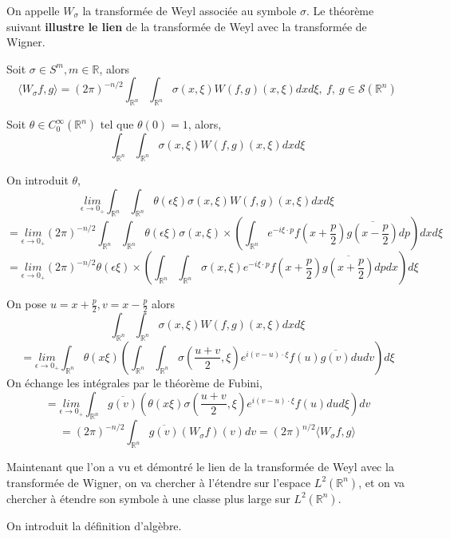 \documentclass[a4paper, 12pt]{report}
\newcommand{\R}{\mathbb{R}} %
\newcommand{\ra}[1][]{\overset{#1}{\rightarrow}} %
\renewcommand{\.}{\cdot} %
\theoremstyle{break}
\theoremstyle{remark}
\theoremstyle{proofstyle}
\begin{document}
On appelle $W_\sigma$ la transformée de Weyl associée au symbole $\sigma$. Le théorème suivant \textbf{illustre le lien} de la transformée de Weyl avec la transformée de Wigner.\vspace{5pt}

\begin{theorem}
    Soit $\sigma \in S^m, m \in \R$, alors
    $$\langle W_\sigma f, g \rangle = (2 \pi)^{-n/2} \int_{\R^n} \int_{\R^n} \sigma(x, \xi) W(f,g) (x, \xi) dx d\xi,~ f,~ g \in \mathcal{S} (\R^n)$$
\end{theorem}
\begin{preuve}
    Soit $\theta \in C_0^\infty(\R^n)$ tel que $\theta(0)=1$, alors,
    $$\int_{\R^n} \int_{\R^n} \sigma(x, \xi) W(f,g)(x,\xi) dx d\xi$$

    On introduit $\theta$,
    $$\underset{\epsilon \ra 0_+}{lim} \int_{\R^n}  \int_{\R^n} \theta( \epsilon \xi) \sigma (x, \xi) W(f,g)(x, \xi) dx d\xi$$
    $$=\underset{\epsilon \ra 0_+}{lim} (2 \pi)^{-n/2} \int_{\R^n}  \int_{\R^n}\theta( \epsilon \xi) \sigma (x, \xi) \times \left( \int_{\R^n} e^{-i \xi \. p} f\left(x+\frac{p}{2}\right) \overline{g\left(x-\frac{p}{2}\right)} dp\right) dx d\xi $$
    $$ = \underset{\epsilon \ra 0_+}{lim} (2 \pi)^{-n/2}  \theta(\epsilon \xi) \times \left( \int_{\R^n} \int_{\R^n} \sigma(x, \xi) e^{-i \xi \. p} f\left(x+\frac{p}{2}\right)\overline{g\left(x+\frac{p}{2}\right)} dp dx\right) d\xi$$

    On pose $u = x + \frac{p}{2}, v = x-\frac{p}{2}$ alors
    $$\int_{\R^n} \int_{\R^n} \sigma (x, \xi) W(f,g)(x, \xi) dx d\xi$$
    $$=\underset{\epsilon \ra 0_+}{lim} \int_{\R^n} \theta(x \xi) \left( \int_{\R^n}\int_{\R^n} \sigma\left(\frac{u+v}{2}, \xi\right) e^{i(v-u) \. \xi} f(u) \overline{g(v)} du dv \right) d \xi$$
    On échange les intégrales par le théorème de Fubini,
    $$=\underset{\epsilon \ra 0_+}{lim} \int_{\R^n} \overline{g(v)} \left( \theta(x \xi) \sigma\left(\frac{u+v}{2}, \xi\right) e^{i(v-u) \. \xi} f(u) du d\xi\right) dv$$
    $$= (2 \pi)^{-n/2} \int_{\R^n} \overline{g(v)} (W_\sigma f)(v) dv = (2 \pi)^{n/2} \langle W_\sigma f, g\rangle$$
\end{preuve}

Maintenant que l'on a vu et démontré le lien de la transformée de Weyl avec la transformée de Wigner, on va chercher à l'étendre sur l'espace $L^2(\R^n)$, et on va chercher à étendre son symbole à une classe plus large sur $L^2(\R^n)$.\vspace{7pt}

On introduit la définition d'algèbre.
\end{document}
